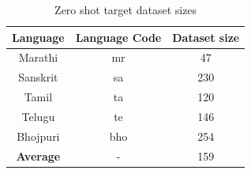\begin{table}[ht]
    \begin{center}
        \begin{tabular}{|c|c||c|}
            \hline
            \textbf{Language} & \textbf{Language Code} & \textbf{Dataset size} \\
            \hline
            Marathi & mr & 47 \\
            \hline
            Sanskrit & sa & 230 \\
            \hline
            Tamil & ta & 120 \\
            \hline
            Telugu & te & 146 \\
            \hline
            Bhojpuri & bho & 254 \\
            \hline
            \textbf{Average} & - & 159 \\
            \hline
        \end{tabular}
        \caption{Zero shot target dataset sizes}
        \label{table:zero_shot_dataset_sizes}
    \end{center}
\end{table}


